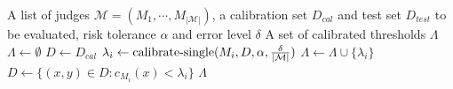 \begin{algorithm}[b]
\caption{$\,\calibrate(\mathcal{M}, D_\textit{cal}, \alpha, \delta)$}\label{alg:calibrate}
\begin{algorithmic}
\Require A list of judges $\mathcal{M} = (M_1, \cdots, M_{|\mathcal{M}|})$, a calibration set $D_\textit{cal}$ and test set $D_\textit{test}$ to be evaluated, risk tolerance $\alpha$ and error level $\delta$
\Ensure A set of calibrated thresholds $\Lambda$
\State $\Lambda \gets \emptyset$ 
\State $D \gets D_\textit{cal}$ 
    \State $\lambda_i \gets \operatorname*{calibrate-single}(M_i, D, \alpha, \frac{\delta}{|\mathcal{M}|})$ 
    \State $\Lambda \gets \Lambda \cup \{\lambda_i\}$
    \State $D \gets \{(x, y) \in D: c_{M_i}(x) < \lambda_i\}$ 
\EndFor
\Return $\Lambda$ 
\end{algorithmic}
\end{algorithm}

